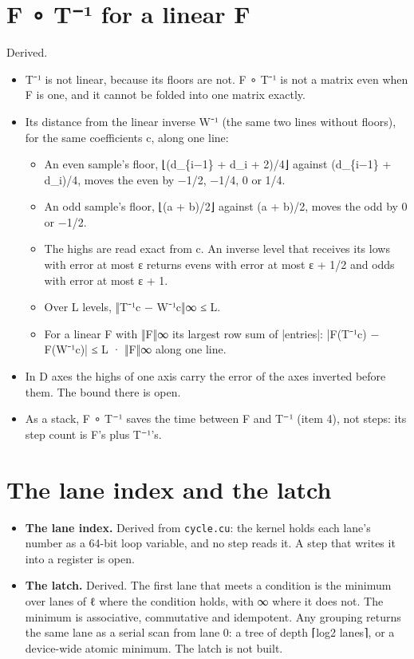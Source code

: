 \section{\texorpdfstring{F ∘ T⁻¹ for a linear F}{F ∘ T⁻¹ for a linear F}}

Derived.

\begin{itemize}
\item T⁻¹ is not linear, because its floors are not. F ∘ T⁻¹ is not a matrix even when F is one, and it cannot be folded into one matrix exactly.
\item Its distance from the linear inverse W⁻¹ (the same two lines without floors), for the same coefficients c, along one line:

\begin{itemize}
\item An even sample's floor, ⌊(d\_\allowbreak{}\{i−1\} + d\_\allowbreak{}i + 2)/4⌋ against (d\_\allowbreak{}\{i−1\} + d\_\allowbreak{}i)/4, moves the even by −1/2, −1/4, 0 or 1/4.
\item An odd sample's floor, ⌊(a + b)/2⌋ against (a + b)/2, moves the odd by 0 or −1/2.
\item The highs are read exact from c. An inverse level that receives its lows with error at most ε returns evens with error at most ε + 1/2 and odds with error at most ε + 1.
\item Over L levels, ‖T⁻¹c − W⁻¹c‖∞ ≤ L.
\item For a linear F with ‖F‖∞ its largest row sum of |entries|: |F(T⁻¹c) − F(W⁻¹c)| ≤ L · ‖F‖∞ along one line.
\end{itemize}
\item In D axes the highs of one axis carry the error of the axes inverted before them. The bound there is open.
\item As a stack, F ∘ T⁻¹ saves the time between F and T⁻¹ (item 4), not steps: its step count is F's plus T⁻¹'s.
\end{itemize}

\section{\texorpdfstring{The lane index and the latch}{The lane index and the latch}}

\begin{itemize}
\item \textbf{The lane index.} Derived from \texttt{cycle.\allowbreak{}cu}: the kernel holds each lane's number as a 64-bit loop variable, and no step reads it. A step that writes it into a register is open.
\item \textbf{The latch.} Derived. The first lane that meets a condition is the minimum over lanes of ℓ where the condition holds, with ∞ where it does not. The minimum is associative, commutative and idempotent. Any grouping returns the same lane as a serial scan from lane 0: a tree of depth ⌈log2 lanes⌉, or a device-wide atomic minimum. The latch is not built.
\end{itemize}


